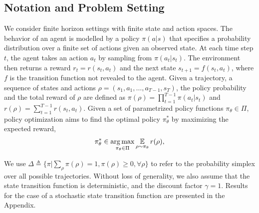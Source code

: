 \subsection{Notation and Problem Setting}
\label{subsec:notations_and_settings}

We consider finite horizon
settings with finite state and action spaces. 
The behavior of an agent is modelled by a policy $\pi(a|s)$
that specifies a probability distribution over a finite set of actions
given an observed state. 
At each time step $t$, the agent takes an action $a_t$ by sampling from
$\pi(a_t | s_t)$.
The environment then returns a reward $r_t = r(s_t, a_t)$ and the next state
$s_{t+1} = f(s_t, a_t)$,
where $f$ is the transition function not revealed to the agent.
Given a trajectory, a sequence of states and actions
$\rho=(s_1, a_1, \dots, a_{T-1}, s_T)$,
the policy probability and the total reward of $\rho$ are defined as
$\pi(\rho) = \prod_{t=1}^{T-1} \pi(a_t| s_t)$
 and $r(\rho) = \sum_{t=1}^{T-1} r(s_t, a_t)$. 
Given a set of parametrized policy functions $\pi_\theta \in \Pi$,
policy optimization aims to find the optimal policy $\pi_\theta^*$
by maximizing the expected reward,
\begin{equation}
\label{max_expected_reward}
\begin{split}
\pi_\theta^* \in \operatorname*{arg\,max}_{\pi_\theta \in \Pi}{ \operatorname*{\mathbb{E}}\limits_{\rho \sim \pi_\theta}{r(\rho)} },
\end{split}
\end{equation}

We use
$\Delta \triangleq \{ \pi | \sum_{\rho}{\pi(\rho)} = 1, \pi(\rho) \ge 0,
\forall \rho \}$
to refer to the probability simplex over all possible trajectories. 
Without loss of generality, we also assume that the state transition function
is deterministic, and the discount factor $\gamma = 1$.
Results for the case of a stochastic state transition function are presented
in the Appendix. %
